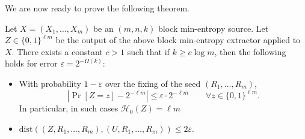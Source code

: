 \documentclass{toc}
\def\dist{\mathrm{dist}}
\def\entropy{\mathcal{H}}
\newcommand{\eps}{\varepsilon}
\begin{document}
We are now ready to prove the following theorem.

%
%
\begin{theorem}
Let $X=(X_1, \ldots, X_m)$ be an $(m,n,k)$ block min-entropy source. Let $Z \in \{0,1\}^{\ell m}$ be the
output of the above block min-entropy extractor applied to $X$. There exists a constant $c>1$ such that if $k \geq c \log m$, then the following
holds for error $\eps=2^{-\Omega(k)}$:

\begin{itemize}
\item With probability $1-\eps$ over the fixing of the seed $(R_1, \dots, R_m)$,
$$\left|\Pr[Z=z]-2^{-\ell m}\right| \leq \eps \cdot 2^{-\ell m} \qquad \forall z \in \{0,1\}^{\ell m}.$$
In particular, in such cases $\entropy_{0}(Z) = \ell m$
\item $\dist\left((Z, R_1, \ldots, R_m),(U, R_1, \ldots, R_m)\right) \leq 2\eps.$
\end{itemize} %
\end{theorem}   %
\end{document}
